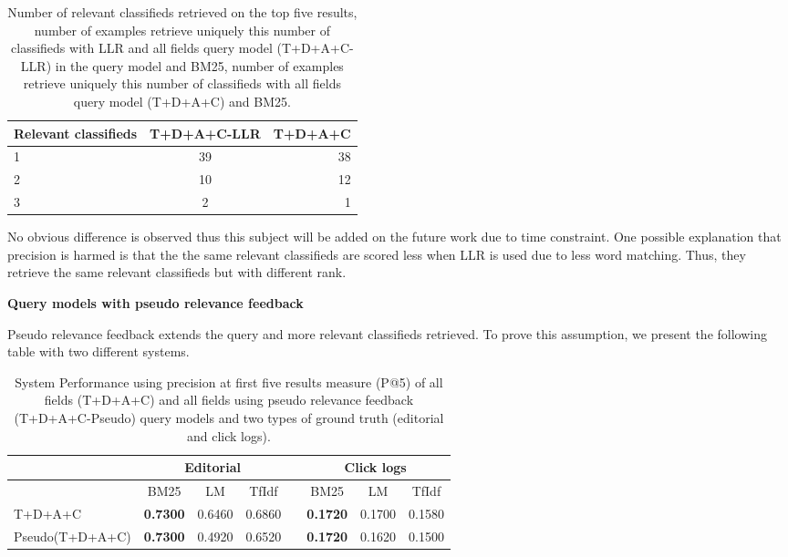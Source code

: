 \begin{table}[H]
\begin{center}
\caption{Number of relevant classifieds retrieved on the top five results, number of examples retrieve uniquely this number of classifieds with LLR and all fields query model (T+D+A+C-LLR) in the query model and BM25, number of examples retrieve uniquely this number of classifieds with all fields query model (T+D+A+C) and BM25.}

\begin{tabular}{lcr}
\midrule
Relevant classifieds &  T+D+A+C-LLR & T+D+A+C \\
\midrule
	1 & 39 & 38 \\
	2 & 10 & 12  \\
	3 & 2 & 1 \\
\bottomrule
\end{tabular}
\end{center}
\end{table}



No obvious difference is observed thus this subject will be added on the future work due to time constraint. One possible explanation that precision is harmed is that the the same relevant classifieds are scored less when LLR is used due to less word matching. Thus, they retrieve the same relevant classifieds but with different rank.


 \textbf{Query models with pseudo relevance feedback}

 Pseudo relevance feedback extends the query and more relevant classifieds retrieved. To prove this assumption, we present the following table with two different systems.

\begin{table}[H]
\begin{center}
\caption{System Performance using precision at first five results measure (P@5) of all fields (T+D+A+C) and all fields using pseudo relevance feedback (T+D+A+C-Pseudo) query models and two types of ground truth (editorial and click logs).}
\begin{tabular}{lccccccc}
\toprule
 & \multicolumn{3}{c}{Editorial} & & \multicolumn{3}{c}{Click logs} \\
\midrule
& BM25 & LM & TfIdf &   & BM25 & LM & TfIdf \\
\midrule
	T+D+A+C & \textbf{0.7300} & 0.6460 & 0.6860 &   &		 \textbf{0.1720} & 0.1700 & 0.1580 \\
	Pseudo(T+D+A+C) & \textbf{0.7300} & 0.4920 & 0.6520 &   & \textbf{0.1720} & 0.1620 & 0.1500 \\
\bottomrule
\end{tabular}
\end{center}
\end{table}

